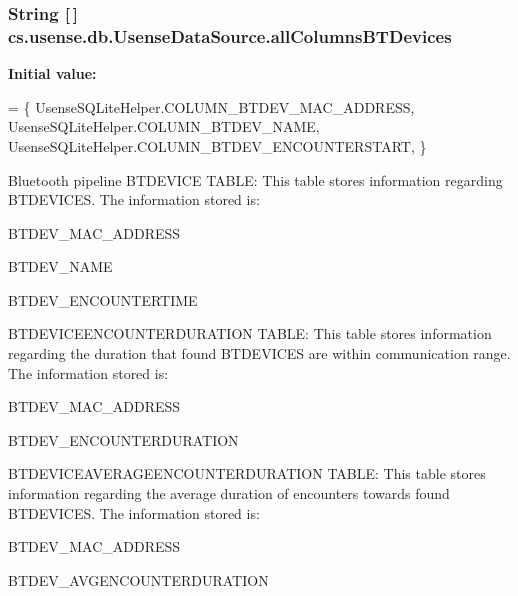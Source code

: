 \subsubsection[{all\+Columns\+B\+T\+Devices}]{\setlength{\rightskip}{0pt plus 5cm}String \mbox{[}$\,$\mbox{]} cs.\+usense.\+db.\+Usense\+Data\+Source.\+all\+Columns\+B\+T\+Devices\hspace{0.3cm}{\ttfamily [private]}}\label{classcs_1_1usense_1_1db_1_1_usense_data_source_af5076f24e3994d5f0969f5ec40104f0f}
{\bfseries Initial value\+:}
\begin{DoxyCode}
= \{ 
            UsenseSQLiteHelper.COLUMN\_BTDEV\_MAC\_ADDRESS,
            UsenseSQLiteHelper.COLUMN\_BTDEV\_NAME,
            UsenseSQLiteHelper.COLUMN\_BTDEV\_ENCOUNTERSTART,
    \}
\end{DoxyCode}
Bluetooth pipeline B\+T\+D\+E\+V\+I\+C\+E T\+A\+B\+L\+E\+: This table stores information regarding B\+T\+D\+E\+V\+I\+C\+E\+S. The information stored is\+:
\begin{DoxyItemize}
\item B\+T\+D\+E\+V\+\_\+\+M\+A\+C\+\_\+\+A\+D\+D\+R\+E\+S\+S
\item B\+T\+D\+E\+V\+\_\+\+N\+A\+M\+E
\item B\+T\+D\+E\+V\+\_\+\+E\+N\+C\+O\+U\+N\+T\+E\+R\+T\+I\+M\+E
\end{DoxyItemize}

B\+T\+D\+E\+V\+I\+C\+E\+E\+N\+C\+O\+U\+N\+T\+E\+R\+D\+U\+R\+A\+T\+I\+O\+N T\+A\+B\+L\+E\+: This table stores information regarding the duration that found B\+T\+D\+E\+V\+I\+C\+E\+S are within communication range. The information stored is\+:
\begin{DoxyItemize}
\item B\+T\+D\+E\+V\+\_\+\+M\+A\+C\+\_\+\+A\+D\+D\+R\+E\+S\+S
\item B\+T\+D\+E\+V\+\_\+\+E\+N\+C\+O\+U\+N\+T\+E\+R\+D\+U\+R\+A\+T\+I\+O\+N
\end{DoxyItemize}

B\+T\+D\+E\+V\+I\+C\+E\+A\+V\+E\+R\+A\+G\+E\+E\+N\+C\+O\+U\+N\+T\+E\+R\+D\+U\+R\+A\+T\+I\+O\+N T\+A\+B\+L\+E\+: This table stores information regarding the average duration of encounters towards found B\+T\+D\+E\+V\+I\+C\+E\+S. The information stored is\+:
\begin{DoxyItemize}
\item B\+T\+D\+E\+V\+\_\+\+M\+A\+C\+\_\+\+A\+D\+D\+R\+E\+S\+S
\item B\+T\+D\+E\+V\+\_\+\+A\+V\+G\+E\+N\+C\+O\+U\+N\+T\+E\+R\+D\+U\+R\+A\+T\+I\+O\+N
\end{DoxyItemize}

